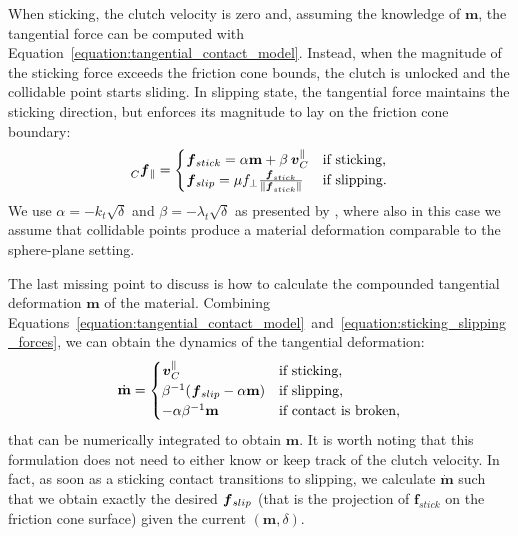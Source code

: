 When sticking, the clutch velocity is zero and, assuming the knowledge of $\mathbf{m}$, the tangential force can be computed with Equation~\eqref{equation:tangential_contact_model}.
Instead, when the magnitude of the sticking force exceeds the friction cone bounds, the clutch is unlocked and the collidable point starts sliding.
In slipping state, the tangential force maintains the sticking direction, but enforces its magnitude to lay on the friction cone boundary:
%
\begin{equation}
    \label{equation:sticking_slipping_forces}
    \forcelin[C]_\parallel =
    \begin{cases}
        \forcelin_{stick} = \alpha \mathbf{m} + \beta \vellin_C^\parallel &\text{if sticking,} \\
        \forcelin_{slip} = \mu f_\perp \frac{\boldsymbol{f}_{stick}}{\norm{\boldsymbol{f}_{stick}}} &\text{if slipping.}
    \end{cases}
\end{equation}
%
We use $\alpha = -k_t\sqrt{\delta}$ and $\beta = -\lambda_t \sqrt{\delta}$ as presented by \textcite{azad_modeling_2010}, where also in this case we assume that collidable points produce a material deformation comparable to the sphere-plane setting.

The last missing point to discuss is how to calculate the compounded tangential deformation $\mathbf{m}$ of the material.
Combining Equations~\eqref{equation:tangential_contact_model}~and~\eqref{equation:sticking_slipping_forces}, we can obtain the dynamics of the tangential deformation:
%
\begin{equation}
    \label{equation:tangential_deformation_dynamics}
    \dot{\mathbf{m}} =
    \begin{cases}
        \vellin_C^\parallel &\text{if sticking,} \\
        \beta^{-1} (\forcelin_{slip} - \alpha \mathbf{m}) &\text{if slipping,} \\
        -\alpha \beta^{-1} \mathbf{m} &\text{if contact is broken,}
    \end{cases}
\end{equation}
%
that can be numerically integrated to obtain $\mathbf{m}$.
It is worth noting that this formulation does not need to either know or keep track of the clutch velocity.
In fact, as soon as a sticking contact transitions to slipping, we calculate $\dot{\mathbf{m}}$ such that we obtain exactly the desired $\prescript{}{}{\boldsymbol{f}}_{slip}$ (that is the projection of $\boldsymbol{f}_{stick}$ on the friction cone surface) given the current $(\mathbf{m}, \delta)$.

